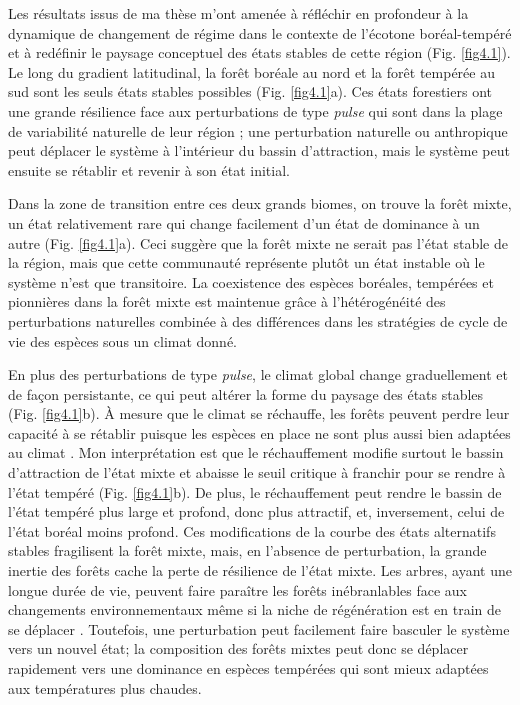 Les résultats issus de ma thèse m'ont amenée à réfléchir en profondeur à
la dynamique de changement de régime dans le contexte de l'écotone
boréal-tempéré et à redéfinir le paysage conceptuel des états stables de
cette région (Fig. \ref{fig4.1}). Le long du gradient latitudinal, la
forêt boréale au nord et la forêt tempérée au sud sont les seuls états
stables possibles (Fig. \ref{fig4.1}a). Ces états forestiers ont une
grande résilience face aux perturbations de type \emph{pulse} qui sont
dans la plage de variabilité naturelle de leur région
\citep{grondin_have_2018}; une perturbation naturelle ou anthropique
peut déplacer le système à l'intérieur du bassin d'attraction, mais le
système peut ensuite se rétablir et revenir à son état initial.

Dans la zone de transition entre ces deux grands biomes, on trouve la
forêt mixte, un état relativement rare qui change facilement d'un état
de dominance à un autre (Fig. \ref{fig4.1}a). Ceci suggère que la forêt
mixte ne serait pas l'état stable de la région, mais que cette
communauté représente plutôt un état instable où le système n'est que
transitoire. La coexistence des espèces boréales, tempérées et
pionnières dans la forêt mixte est maintenue grâce à l'hétérogénéité des
perturbations naturelles combinée à des différences dans les stratégies
de cycle de vie des espèces
\citep{kneeshaw_natural_2007, bouchard_tree_2006} sous un climat donné.

En plus des perturbations de type \emph{pulse}, le climat global change
graduellement et de façon persistante, ce qui peut altérer la forme du
paysage des états stables (Fig. \ref{fig4.1}b). À mesure que le climat
se réchauffe, les forêts peuvent perdre leur capacité à se rétablir
puisque les espèces en place ne sont plus aussi bien adaptées au climat
\citep{johnstone_changing_2016}. Mon interprétation est que le
réchauffement modifie surtout le bassin d'attraction de l'état mixte et
abaisse le seuil critique à franchir pour se rendre à l'état tempéré
(Fig. \ref{fig4.1}b). De plus, le réchauffement peut rendre le bassin de
l'état tempéré plus large et profond, donc plus attractif, et,
inversement, celui de l'état boréal moins profond. Ces modifications de
la courbe des états alternatifs stables fragilisent la forêt mixte,
mais, en l'absence de perturbation, la grande inertie des forêts cache
la perte de résilience de l'état mixte. Les arbres, ayant une longue
durée de vie, peuvent faire paraître les forêts inébranlables face aux
changements environnementaux même si la niche de régénération est en
train de se déplacer
\citep{sittaro_tree_2017, boisvertmarsh_divergent_2019}. Toutefois, une
perturbation peut facilement faire basculer le système vers un nouvel
état; la composition des forêts mixtes peut donc se déplacer rapidement
vers une dominance en espèces tempérées qui sont mieux adaptées aux
températures plus chaudes.

